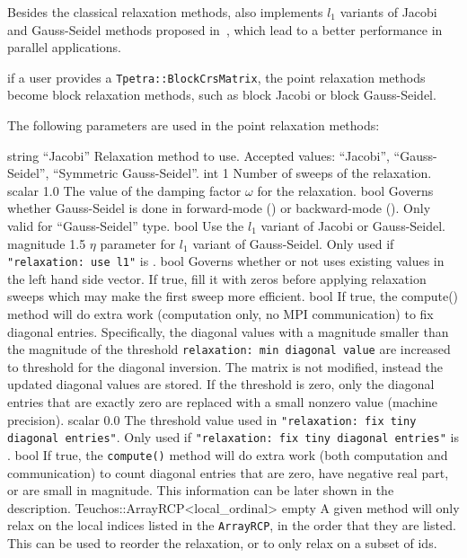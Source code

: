 Besides the classical relaxation methods, \ifpacktwo{} also implements $l_1$
variants of Jacobi and Gauss-Seidel methods proposed in~\cite{Baker2011}, which
lead to a better performance in parallel applications.

 if a user provides a \texttt{Tpetra::BlockCrsMatrix}, the point relaxation
methods become block relaxation methods, such as block Jacobi or block
Gauss-Seidel.

The following parameters are used in the point relaxation methods:

    {string}
    {``Jacobi''}
    {Relaxation method to use. Accepted values: ``Jacobi'',
     ``Gauss-Seidel'', ``Symmetric Gauss-Seidel''.}
    {int}
    {1}
    {Number of sweeps of the relaxation.}
    {scalar}
    {1.0}
    {The value of the damping factor $\omega$ for the relaxation.}
    {bool}
    {\false}
    {Governs whether Gauss-Seidel is done in forward-mode (\false) or
     backward-mode (\true). Only valid for ``Gauss-Seidel'' type.}
    {bool}
    {\false}
    {Use the $l_1$ variant of Jacobi or Gauss-Seidel.}
    {magnitude}
    {1.5}
    {$\eta$ parameter for $l_1$ variant of Gauss-Seidel. Only used if
     {\tt "relaxation: use l1"} is \true.}
    {bool}
    {\true}
    {Governs whether or not \ifpacktwo{} uses existing values in the left hand
     side vector. If true, \ifpacktwo{} fill it with zeros before applying
     relaxation sweeps which may make the first sweep more efficient.}
    {bool}
    {\false}
    {If true, the compute() method will do extra work (computation only, no MPI
     communication) to fix diagonal entries. Specifically, the diagonal values
     with a magnitude smaller than the magnitude of the threshold \texttt{relaxation: min
     diagonal value} are increased to threshold for the diagonal inversion. The
     matrix is not modified, instead the updated diagonal values are stored. If the
     threshold is zero, only the diagonal entries that are exactly zero are replaced
     with a small nonzero value (machine precision).}
    {scalar}
    {0.0}
    {The threshold value used in {\tt "relaxation: fix tiny diagonal entries"}.
     Only used if {\tt "relaxation: fix tiny diagonal entries"} is \true.}
    {bool}
    {\false}
    {If true, the \texttt{compute()} method will do extra work (both computation
     and communication) to count diagonal entries that are zero, have negative
     real part, or are small in magnitude. This information can be later shown
     in the description.}
    {Teuchos::ArrayRCP<local\_ordinal>}
    {empty}
    {A given method will only relax on the local indices listed in the
     \texttt{ArrayRCP}, in the order that they are listed. This can be used to
     reorder the relaxation, or to only relax on a subset of ids.}

